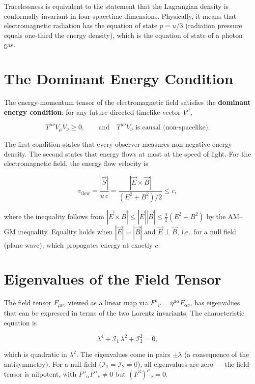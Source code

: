 Tracelessness is equivalent to the statement that the Lagrangian density is conformally invariant in four spacetime dimensions. Physically, it means that electromagnetic radiation has the equation of state $p = u/3$ (radiation pressure equals one-third the energy density), which is the equation of state of a photon gas.

\section{The Dominant Energy Condition}

The energy-momentum tensor of the electromagnetic field satisfies the \textbf{dominant energy condition}: for any future-directed timelike vector $V^\mu$,

\begin{equation}
T^{\mu\nu}V_\mu V_\nu \geq 0, \qquad \text{and} \quad T^{\mu\nu}V_\nu \text{ is causal (non-spacelike)}.
\end{equation}

The first condition states that every observer measures non-negative energy density. The second states that energy flows at most at the speed of light. For the electromagnetic field, the energy flow velocity is

\begin{equation}
v_{\text{flow}} = \frac{|\vec{S}|}{u\,c} = \frac{|\vec{E}\times\vec{B}|}{(E^2 + B^2)/2} \leq c,
\end{equation}

where the inequality follows from $|\vec{E}\times\vec{B}| \leq |\vec{E}||\vec{B}| \leq \frac{1}{2}(E^2 + B^2)$ by the AM--GM inequality. Equality holds when $|\vec{E}| = |\vec{B}|$ and $\vec{E}\perp\vec{B}$, i.e.\ for a null field (plane wave), which propagates energy at exactly $c$.

\section{Eigenvalues of the Field Tensor}

The field tensor $F_{\mu\nu}$, viewed as a linear map via $F^\mu{}_\nu = \eta^{\mu\alpha}F_{\alpha\nu}$, has eigenvalues that can be expressed in terms of the two Lorentz invariants. The characteristic equation is

\begin{equation}
\lambda^4 + \mathcal{I}_1\,\lambda^2 + \mathcal{I}_2^2 = 0,
\end{equation}

which is quadratic in $\lambda^2$. The eigenvalues come in pairs $\pm\lambda$ (a consequence of the antisymmetry). For a null field ($\mathcal{I}_1 = \mathcal{I}_2 = 0$), all eigenvalues are zero --- the field tensor is nilpotent, with $F^\mu{}_\alpha F^\alpha{}_\nu \neq 0$ but $(F^3)^\mu{}_\nu = 0$.

